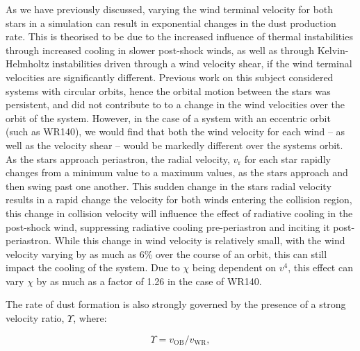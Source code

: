 \documentclass[fleqn,usenatbib]{mnras}
\newcommand{\rms}[1]{\ensuremath{_{\text{#1}}}}
\begin{document}
As we have previously discussed, varying the wind terminal velocity for both stars in a simulation can result in exponential changes in the dust production rate.
This is theorised to be due to the increased influence of thermal instabilities through increased cooling in slower post-shock winds, as well as through Kelvin-Helmholtz instabilities driven through a wind velocity shear, if the wind terminal velocities are significantly different.
Previous work on this subject considered systems with circular orbits, hence the orbital motion between the stars was persistent, and did not contribute to to a change in the wind velocities over the orbit of the system.
However, in the case of a system with an eccentric orbit (such as WR140), we would find that both the wind velocity for each wind -- as well as the velocity shear -- would be markedly different over the systems orbit.
As the stars approach periastron, the radial velocity, $v\rms{r}$ for each star rapidly changes from a minimum value to a maximum values, as the stars approach and then swing past one another.
This sudden change in the stars radial velocity results in a rapid change the velocity for both winds entering the collision region, this change in collision velocity will influence the effect of radiative cooling in the post-shock wind, suppressing radiative cooling pre-periastron and inciting it post-periastron. 
While this change in wind velocity is relatively small, with the wind velocity varying by as much as 6\% over the course of an orbit, this can still impact the cooling of the system.
Due to $\chi$ being dependent on $v^4$, this effect can vary $\chi$ by as much as a factor of 1.26 in the case of WR140.

The rate of dust formation is also strongly governed by the presence of a strong velocity ratio, $\Upsilon$, where:

\begin{equation}
  \Upsilon = v\rms{OB} / v\rms{WR}, 
\end{equation}
\end{document}

